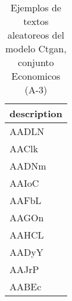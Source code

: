 \begin{table}[H]
\centering
\fontsize{8}{14}\selectfont
\caption{Ejemplos de textos aleatoreos del modelo Ctgan, conjunto Economicos (A-3)}
\label{table-sample10-economicos-a-3-ctgan-text}
\begin{tabular}{|m{50em}|}
\hline
\rowcolor[gray]{0.8}
description \\
\hline AADLN \\
\hline AAClk \\
\hline AADNm \\
\hline AAIoC \\
\hline AAFbL \\
\hline AAGOn \\
\hline AAHCL \\
\hline AADyY \\
\hline AAJrP \\
\hline AABEc \\
\hline
\end{tabular}
\end{table}

